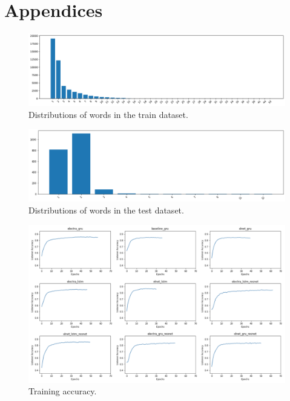 \section{Appendices}
\label{sec:appendix}

\begin{figure}[htb!]
  \centering
  \includegraphics[width=\textwidth]{assets/trainset_words.pdf}
  \caption[Train dataset words]{Distributions of words in the train dataset.}
  \label{figure:trainset-words}
\end{figure}

\begin{figure}[htb!]
  \centering
  \includegraphics[width=\textwidth]{assets/testset_words.png}
  \caption[Test dataset words]{Distributions of words in the test dataset.}
  \label{figure:testset-words}
\end{figure}

\begin{figure}[htb!]
  \centering
  \includegraphics[width=\textwidth]{assets/training_accuracy.png}
  \caption[Training Accuracy]{Training accuracy.}
  \label{figure:training-accuracy}
\end{figure}

